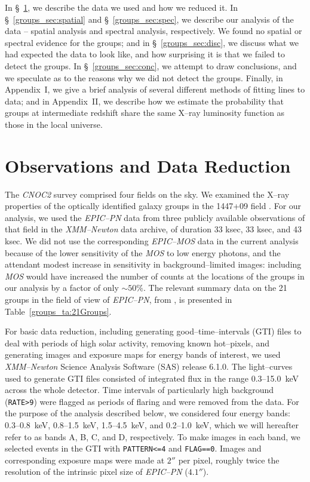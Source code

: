 In \S~\ref{groups_sec:obs}, we describe the data we used and how we
reduced it.  In \S~\ref{groups_sec:spatial} and
\S~\ref{groups_sec:spec}, we describe our analysis of the data --
spatial analysis and spectral analysis, respectively.  We found no
spatial or spectral evidence for the groups; and in
\S~\ref{groups_sec:disc}, we discuss what we had expected the data to
look like, and how surprising it is that we failed to detect the
groups.  In \S~\ref{groups_sec:conc}, we attempt to draw conclusions,
and we speculate as to the reasons why we did not detect the groups.
Finally, in Appendix~I, we give a brief analysis of several different
methods of fitting lines to data; and in Appendix~II, we describe how
we estimate the probability that groups at intermediate redshift share
the same X--ray luminosity function as those in the local universe.


\section{Observations and Data Reduction}
\label{groups_sec:obs}
The \textsl{CNOC2} survey comprised four fields on the sky.  We
examined the X--ray properties of the optically identified galaxy
groups in the 1447+09 field \citep{carlberg2001eg, carlberg2001gg}.
For our analysis, we used the \textsl{EPIC--PN} data from three
publicly available observations of that field in the
\textsl{XMM--Newton} data archive, of duration 33 ksec, 33 ksec, and
43 ksec.  We did not use the corresponding \textsl{EPIC--MOS} data in
the current analysis because of the lower sensitivity of the
\textsl{MOS} to low energy photons, and the attendant modest increase
in sensitivity in background--limited images: including \textsl{MOS}
would have increased the number of counts at the locations of the
groups in our analysis by a factor of only $\sim 50\%$.  The relevant
summary data on the 21 groups in the field of view of
\textsl{EPIC--PN}, from \citet{carlberg2001eg}, is presented in
Table~\ref{groups_ta:21Groups}.

For basic data reduction, including generating good--time--intervals
(GTI) files to deal with periods of high solar activity, removing
known hot--pixels, and generating images and exposure maps for energy
bands of interest, we used \textsl{XMM--Newton} Science Analysis
Software (SAS) release 6.1.0.  The light--curves used to generate GTI
files consisted of integrated flux in the range 0.3--15.0~keV across
the whole detector.  Time intervals of particularly high background
({\tt RATE>9}) were flagged as periods of flaring and were removed
from the data.  For the purpose of the analysis described below, we
considered four energy bands: 0.3--0.8~keV, 0.8--1.5~keV,
1.5--4.5~keV, and 0.2--1.0~keV, which we will hereafter refer to as
bands A, B, C, and D, respectively.  To make images in each band, we
selected events in the GTI with {\tt PATTERN<=4} and {\tt FLAG==0}.
Images and corresponding exposure maps were made at $2''$ per pixel,
roughly twice the resolution of the intrinsic pixel size of
\textsl{EPIC--PN} ($4.1''$).

